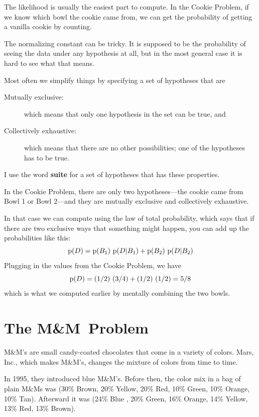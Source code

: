 \documentclass[12pt]{book}
\begin{document}
The likelihood is usually the easiest part to compute.  In the
Cookie Problem, if we know which bowl the cookie came from,
we can get the probability of getting a vanilla cookie by counting.

The normalizing constant can be tricky.  It is supposed to be the
probability of seeing the data under any hypothesis at all, but in the
most general case it is hard to see what that means.

Most often we simplify things by specifying a set of hypotheses
that are

\begin{description}

\item[Mutually exclusive:] which means that only one hypothesis in
the set can be true, and

\item[Collectively exhaustive:] which means that there are no other
possibilities; one of the hypotheses has to be true.

\end{description}

I use the word {\bf suite} for a set of hypotheses that has these
properties.

In the Cookie Problem, there are only two hypotheses---the cookie
came from Bowl 1 or Bowl 2---and they are mutually exclusive and
collectively exhaustive.

In that case we can compute  using the law of total probability,
which says that if there are two exclusive ways that something
might happen, you can add up the probabilities like this:
%
\[ \mathrm{p}(D) = \mathrm{p}(B_1)~\mathrm{p}(D|B_1) + \mathrm{p}(B_2)~\mathrm{p}(D|B_2) \]
%
Plugging in the values from the Cookie Problem, we have
%
\[ \mathrm{p}(D) = (1/2)~(3/4) + (1/2)~(1/2) = 5/8 \]
%
which is what we computed earlier by mentally combining the two
bowls.


\newcommand{\MM}{M\&M}

\section{The \MM~Problem}

\MM's are small candy-coated chocolates that come in a variety of
colors.  Mars, Inc., which makes \MM's, changes the mixture of
colors from time to time.

In 1995, they introduced blue \MM's.  Before then, the color mix in
a bag of plain M\&Ms was (30\% Brown, 20\% Yellow, 20\% Red, 10\%
Green, 10\% Orange, 10\% Tan).  Afterward it was (24\% Blue , 20\%
Green, 16\% Orange, 14\% Yellow, 13\% Red, 13\% Brown).
\end{document}
